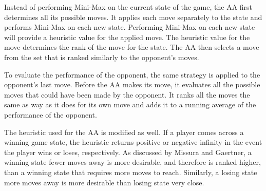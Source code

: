\documentclass[12pt]{article}
\begin{document}
Instead of performing Mini-Max on the current state of the game, the AA first determines all its possible moves. It applies each move separately to the state and performs Mini-Max on each new state. Performing Mini-Max on each new state will provide a heuristic value for the applied move. The heuristic value for the move determines the rank of the move for the state. The AA then selects a move from the set that is ranked similarly to the opponent's moves.

To evaluate the performance of the opponent, the same strategy is applied to the opponent's last move. Before the AA makes its move, it evaluates all the possible moves that could have been made by the opponent. It ranks all the moves the same as way as it does for its own move and adds it to a running average of the performance of the opponent.

The heuristic used for the AA is modified as well. If a player comes across a winning game state, the heuristic returns positive or negative infinity in the event the player wins or loses, respectively. As discussed by Missura and Gaertner, a winning state fewer moves away is more desirable, and therefore is ranked higher, than a winning state that requires more moves to reach. Similarly, a losing state more moves away is more desirable than losing state very close.
\end{document}
